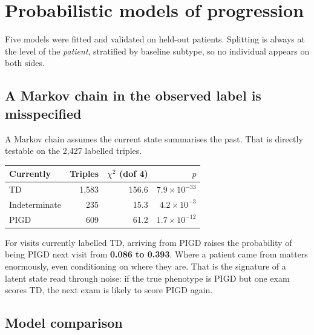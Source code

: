 \documentclass[11pt,a4paper]{article}
\begin{document}
\section{Probabilistic models of progression}

Five models were fitted and validated on held-out patients. Splitting is always
at the level of the \emph{patient}, stratified by baseline subtype, so no
individual appears on both sides.

\subsection{A Markov chain in the observed label is misspecified}

A Markov chain assumes the current state summarises the past. That is directly
testable on the 2{,}427 labelled triples.

\begin{table}[H]
\centering
\begin{tabular}{@{}lrrr@{}}
\toprule
\textbf{Currently} & \textbf{Triples} & \textbf{$\chi^2$ (dof 4)} & \textbf{$p$} \\
\midrule
TD            & 1{,}583 & 156.6 & $7.9\times10^{-33}$ \\
Indeterminate & \phantom{0,}235 & \phantom{0}15.3 & $4.2\times10^{-3}$ \\
PIGD          & \phantom{0,}609 & \phantom{0}61.2 & $1.7\times10^{-12}$ \\
\bottomrule
\end{tabular}
\end{table}

For visits currently labelled TD, arriving from PIGD raises the probability of
being PIGD next visit from \textbf{0.086 to 0.393}. Where a patient came from
matters enormously, even conditioning on where they are. That is the signature of
a latent state read through noise: if the true phenotype is PIGD but one exam
scores TD, the next exam is likely to score PIGD again.

\subsection{Model comparison}
\end{document}
